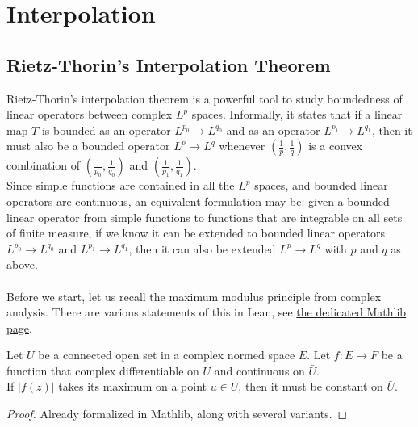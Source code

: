 \chapter{Interpolation}
\label{chap:interpolation}

\section{Rietz-Thorin's Interpolation Theorem}
Rietz-Thorin's interpolation theorem is a powerful tool to study boundedness of linear operators between complex $L^p$ spaces.
Informally, it states that if a linear map $T$ is bounded as an operator $L^{p_0}\to L^{q_0}$ and as an operator $L^{p_1} \to L^{q_1}$, then
it must also be a bounded operator $L^p \to L^q$ whenever $\left(\frac{1}{p}, \frac{1}{q}\right)$ is a convex combination of $\left(\frac{1}{p_0}, \frac{1}{q_0}\right)$ and $\left(\frac{1}{p_1}, \frac{1}{q_1}\right)$.\\
Since simple functions are contained in all the $L^p$ spaces, and bounded linear operators are continuous, an equivalent formulation may be: given a bounded linear operator from simple functions to functions that are integrable on all sets of finite measure, if we know it can be extended to bounded linear
operators $L^{p_0} \to L^{q_0}$ and $L^{p_1} \to L^{q_1}$, then it can also be extended $L^p \to L^q$ with $p$ and $q$ as above.\\\\
Before we start, let us recall the maximum modulus principle from complex analysis.
There are various statements of this in Lean, see \href{https://leanprover-community.github.io/mathlib4_docs/Mathlib/Analysis/Complex/AbsMax.html}{the dedicated Mathlib page}.

\begin{theorem}
    \label{thm:maximum_modulus}
    \leanok
    Let $U$ be a connected open set in a complex normed space $E$. Let $f:E\to F$ be a function that
    complex differentiable on $U$ and continuous on $\bar{U}$.\\
    If $|f(z)|$ takes its maximum on a point $u\in U$, then it must be constant on $\bar{U}$.
\end{theorem}
\begin{proof}
    \leanok
    Already formalized in Mathlib, along with several variants.
\end{proof}



